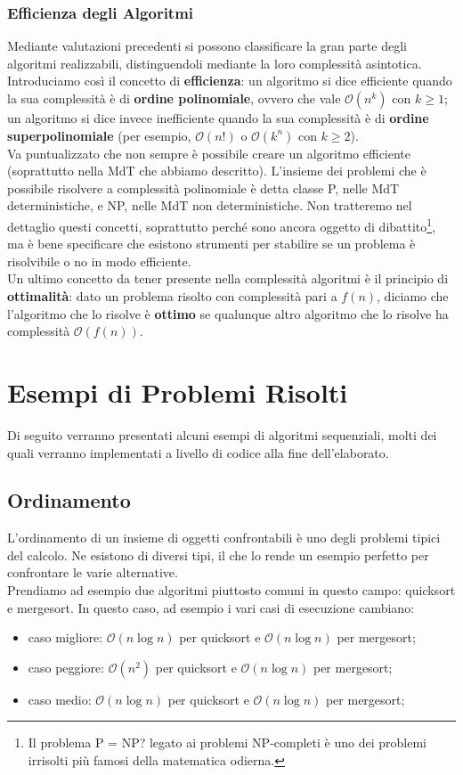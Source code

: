 \subsection{Efficienza degli Algoritmi}
Mediante valutazioni precedenti si possono classificare la gran parte degli algoritmi realizzabili, distinguendoli mediante la loro complessità asintotica. Introduciamo così il concetto di \textbf{efficienza}: un algoritmo si dice efficiente quando la sua complessità è di \textbf{ordine polinomiale}, ovvero che vale $\mathcal{O}(n^k)$ con $k \geq 1$; un algoritmo si dice invece inefficiente quando la sua complessità è di \textbf{ordine superpolinomiale} (per esempio, $\mathcal{O}(n!)$ o $\mathcal{O}(k^n)$ con $k \geq 2$).\\
Va puntualizzato che non sempre è possibile creare un algoritmo efficiente (soprattutto nella MdT che abbiamo descritto). L'insieme dei problemi che è possibile risolvere a complessità polinomiale è detta classe P, nelle MdT deterministiche, e NP, nelle MdT non deterministiche. Non tratteremo nel dettaglio questi concetti, soprattutto perché sono ancora oggetto di dibattito\footnote{Il problema P = NP? legato ai problemi NP-completi è uno dei problemi irrisolti più famosi della matematica odierna.}, ma è bene specificare che esistono strumenti per stabilire se un problema è risolvibile o no in modo efficiente.\\
Un ultimo concetto da tener presente nella complessità algoritmi è il principio di \textbf{ottimalità}: dato un problema risolto con complessità pari a $f(n)$, diciamo che l'algoritmo che lo risolve è \textbf{ottimo} se qualunque altro algoritmo che lo risolve ha complessità $\mathcal{O}(f(n))$.
\chapter{Esempi di Problemi Risolti}
Di seguito verranno presentati alcuni esempi di algoritmi sequenziali, molti dei quali verranno implementati a livello di codice alla fine dell'elaborato.
\section{Ordinamento}
L'ordinamento di un insieme di oggetti confrontabili è uno degli problemi tipici del calcolo. Ne esistono di diversi tipi, il che lo rende un esempio perfetto per confrontare le varie alternative.\\
Prendiamo ad esempio due algoritmi piuttosto comuni in questo campo: quicksort e mergesort. In questo caso, ad esempio i vari casi di esecuzione cambiano:
\begin{itemize}
\item{caso migliore:  $\mathcal {O}(n \log {}n)$ per quicksort e  $\mathcal {O}(n \log {}n)$ per mergesort;}
\item{caso peggiore:  $\mathcal {O}(n^2)$ per quicksort e  $\mathcal {O}(n \log {}n)$ per mergesort;}
\item{caso medio:  $\mathcal {O}(n \log {}n)$ per quicksort e  $\mathcal {O}(n \log {}n)$ per mergesort;}
\end{itemize}

